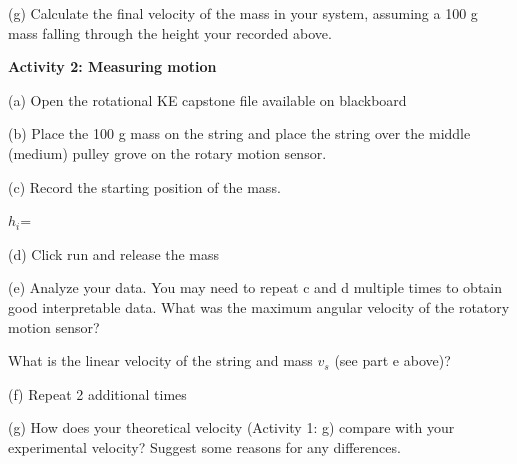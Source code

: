 (g) Calculate the final velocity of the mass in your system, assuming a 100 g mass falling through the height your recorded above.
\answerspace{20mm}

\newpage

\textbf{Activity 2: Measuring motion}  

(a) Open the rotational KE capstone file available on blackboard 

(b) Place the 100 g mass on the string and place the string over the middle (medium) pulley grove on the rotary motion sensor. 

(c) Record the starting position of the mass.
\answerspace{2mm}

\( h_{i} \)=
\answerspace{2mm}

(d) Click run and release the mass

(e) Analyze your data. You may need to repeat c and d multiple times to obtain good interpretable data.
What was the maximum angular velocity of the rotatory motion sensor?
\answerspace{3mm} 

What is the linear velocity of the string and mass \(v_{s} \) (see part e above)?
\answerspace{3mm} 

(f) Repeat 2 additional times 


(g) How does your theoretical velocity (Activity 1: g) compare with your experimental velocity?  Suggest some reasons for any differences.

\newpage
